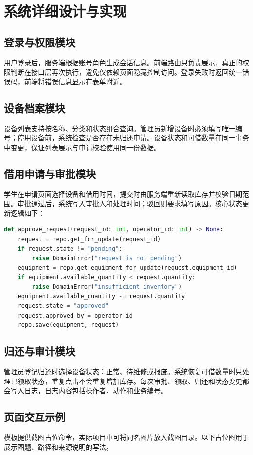 \chapter{系统详细设计与实现}
\section{登录与权限模块}
用户登录后，服务端根据账号角色生成会话信息。前端路由只负责展示，真正的权限判断在接口层再次执行，避免仅依赖页面隐藏控制访问。登录失败时返回统一错误码，前端将错误信息显示在表单附近。
\section{设备档案模块}
设备列表支持按名称、分类和状态组合查询。管理员新增设备时必须填写唯一编号；停用设备前，系统检查是否存在未归还申请。设备状态和可借数量在同一事务中变更，保证列表展示与申请校验使用同一份数据。
\section{借用申请与审批模块}
学生在申请页面选择设备和借用时间，提交时由服务端重新读取库存并校验日期范围。审批通过后，系统写入审批人和处理时间；驳回则要求填写原因。核心状态更新逻辑如下：
\begin{lstlisting}[style=thesiscode,language=python]
def approve_request(request_id: int, operator_id: int) -> None:
    request = repo.get_for_update(request_id)
    if request.state != "pending":
        raise DomainError("request is not pending")
    equipment = repo.get_equipment_for_update(request.equipment_id)
    if equipment.available_quantity < request.quantity:
        raise DomainError("insufficient inventory")
    equipment.available_quantity -= request.quantity
    request.state = "approved"
    request.approved_by = operator_id
    repo.save(equipment, request)
\end{lstlisting}
\section{归还与审计模块}
管理员登记归还时选择设备状态：正常、待维修或报废。系统恢复可借数量时只处理已领取状态，重复点击不会重复增加库存。每次审批、领取、归还和状态变更都会写入日志，日志内容包括操作者、动作和业务编号。
\section{页面交互示例}
模板提供截图占位命令，实际项目中可将同名图片放入截图目录。以下占位图用于展示图题、路径和来源说明的写法。
\begin{figure}[H]\centering{}\end{figure}
